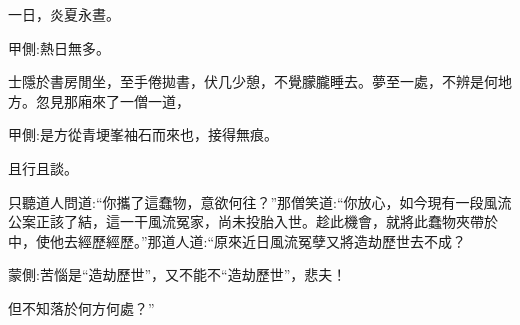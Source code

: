 \begin{parag}
    一日，炎夏永晝。\begin{note}甲側:熱日無多。\end{note}士隱於書房閒坐，至手倦拋書，伏几少憩，不覺朦朧睡去。夢至一處，不辨是何地方。忽見那廂來了一僧一道，\begin{note}甲側:是方從青埂峯袖石而來也，接得無痕。\end{note}且行且談。
\end{parag}


\begin{parag}
    只聽道人問道:“你攜了這蠢物，意欲何往？”那僧笑道:“你放心，如今現有一段風流公案正該了結，這一干風流冤家，尚未投胎入世。趁此機會，就將此蠢物夾帶於中，使他去經歷經歷。”那道人道:“原來近日風流冤孽又將造劫歷世去不成？\begin{note}蒙側:苦惱是“造劫歷世”，又不能不“造劫歷世”，悲夫！\end{note}但不知落於何方何處？”
\end{parag}


